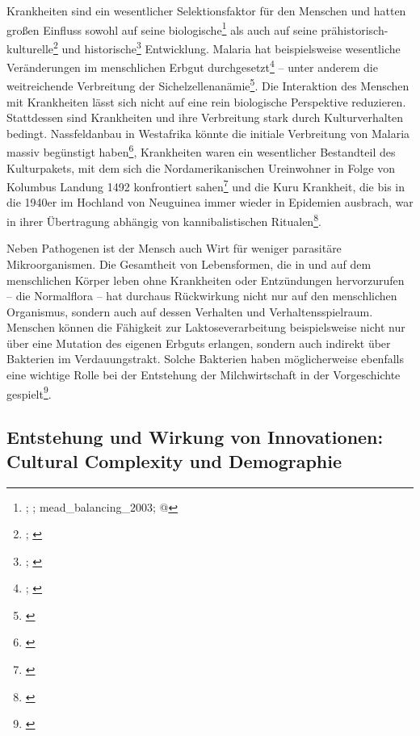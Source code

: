 \documentclass[openany,twoside,twocolumn]{book}
\let\rmarkdownfootnote\footnote%
\def\footnote{\protect\rmarkdownfootnote}
\begin{document}
Krankheiten sind ein wesentlicher Selektionsfaktor für den Menschen und
hatten großen Einfluss sowohl auf seine biologische\footnote{\textcite{bustamante_natural_2005};
  \textcite{enard_viruses_2016}; mead\_balancing\_2003;
  \textcite{sabeti_genome-wide_2007}@} als auch auf seine
prähistorisch-kulturelle\footnote{\textcite{martin_health_2002};
  \textcite{oxenham_skeletal_2005}} und historische\footnote{\textcite{alfani_plague_2013};
  \textcite{murray_estimation_2006}} Entwicklung. Malaria hat
beispielsweise wesentliche Veränderungen im menschlichen Erbgut
durchgesetzt\footnote{\textcite{kwiatkowski_how_2005};
  \textcite{tishkoff_haplotype_2001}} -- unter anderem die weitreichende
Verbreitung der Sichelzellenanämie\footnote{\textcite{allison_protection_1954}}.
Die Interaktion des Menschen mit Krankheiten lässt sich nicht auf eine
rein biologische Perspektive reduzieren. Stattdessen sind Krankheiten
und ihre Verbreitung stark durch Kulturverhalten bedingt. Nassfeldanbau
in Westafrika könnte die initiale Verbreitung von Malaria massiv
begünstigt haben\footnote{\textcite{durham_coevolution_1991-1}},
Krankheiten waren ein wesentlicher Bestandteil des Kulturpakets, mit dem
sich die Nordamerikanischen Ureinwohner in Folge von Kolumbus Landung
1492 konfrontiert sahen\footnote{\textcite{nunn_columbian_2010}} und die
Kuru Krankheit, die bis in die 1940er im Hochland von Neuguinea immer
wieder in Epidemien ausbrach, war in ihrer Übertragung abhängig von
kannibalistischen Ritualen\footnote{\textcite{lindenbaum_kuru_2015}}.

Neben Pathogenen ist der Mensch auch Wirt für weniger parasitäre
Mikroorganismen. Die Gesamtheit von Lebensformen, die in und auf dem
menschlichen Körper leben ohne Krankheiten oder Entzündungen
hervorzurufen -- die Normalflora -- hat durchaus Rückwirkung nicht nur
auf den menschlichen Organismus, sondern auch auf dessen Verhalten und
Verhaltensspielraum. Menschen können die Fähigkeit zur
Laktoseverarbeitung beispielsweise nicht nur über eine Mutation des
eigenen Erbguts erlangen, sondern auch indirekt über Bakterien im
Verdauungstrakt. Solche Bakterien haben möglicherweise ebenfalls eine
wichtige Rolle bei der Entstehung der Milchwirtschaft in der
Vorgeschichte gespielt\footnote{\textcite{walter_human_2011}}.

\hypertarget{entstehung-und-wirkung-von-innovationen-cultural-complexity-und-demographie}{%
\subsection{Entstehung und Wirkung von Innovationen: Cultural Complexity
und
Demographie}\label{entstehung-und-wirkung-von-innovationen-cultural-complexity-und-demographie}}
\end{document}
